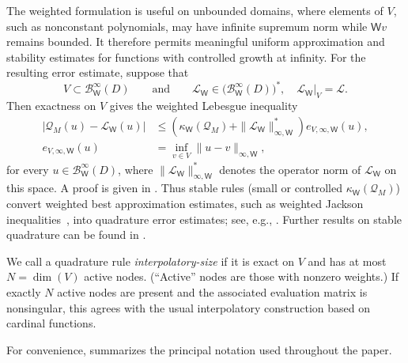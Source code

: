 \documentclass[10pt,dvipsnames]{amsart}
\begin{document}
The weighted formulation is useful on unbounded domains, where elements of
\(V\), such as nonconstant polynomials, may have infinite supremum norm while
\(\mathsf Wv\) remains bounded. It therefore permits meaningful uniform
approximation and stability estimates for functions with controlled growth at
infinity. For the resulting error estimate, suppose that
\[
    V\subset \mathcal{B}^\infty_{\mathsf W}(D)
    \qquad\text{and}\qquad
    \mathcal L_{\mathsf W}\in
    \bigl(\mathcal{B}^\infty_{\mathsf W}(D)\bigr)^*,
    \quad
    \mathcal L_{\mathsf W}|_V=\mathcal L.
\]
Then exactness on \(V\) gives the weighted Lebesgue inequality
\begin{align}\label{eq:quad-lebesgue}
    |\mathcal Q_M(u)-\mathcal L_{\mathsf W}(u)|
    &\leq
    \left(
        \kappa_{\mathsf W}(\mathcal Q_M)
        +
        \|\mathcal L_{\mathsf W}\|_{\infty,\mathsf W}^*
    \right)
    e_{V,\infty,\mathsf W}(u),\\
    \label{eq:quad-pointwise-err}
    e_{V,\infty,\mathsf W}(u)
    &=
    \inf_{v\in V}\|u-v\|_{\infty,\mathsf W},
\end{align}
for every \(u\in \mathcal{B}^\infty_{\mathsf W}(D)\), where
\(\|\mathcal L_{\mathsf W}\|_{\infty,\mathsf W}^*\) denotes the operator norm
of \(\mathcal L_{\mathsf W}\) on this space.
A proof is given in . Thus stable
rules (small or controlled $\kappa_{\mathsf W}(\mathcal Q_M)$) convert weighted best approximation estimates, such as weighted Jackson
inequalities~\cite{Jackson1982,Passow1970}, into quadrature error estimates; see, e.g.,
\cite{lubinsky2007survey}. Further results on stable quadrature can be found in
\cite{Brass2011,Watson1980,Ibrahimoglu2016}.

We call a quadrature rule \emph{interpolatory-size} if it is exact on \(V\) and
has at most \(N=\dim(V)\) active nodes. (``Active'' nodes are those with
nonzero weights.) If exactly \(N\) active nodes are present and the associated
evaluation matrix is nonsingular, this agrees with the usual interpolatory
construction based on cardinal functions.

For convenience,  summarizes the principal notation used
throughout the paper.
\end{document}
